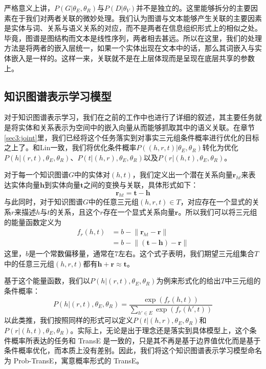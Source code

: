 严格意义上讲，$P(G|{\theta_E,\theta_R})$与$P(D|{\theta_V})$并不是独立的。这里能够拆分的主要因素在于我们对两者关联的微妙处理。我们认为图谱与文本能够产生关联的主要因素是实体与词、关系与语义关系的对应，而不是两者在信息组织形式上的相似之处。毕竟，图谱是图结构而文本是线性序列，两者相去甚远。所以在这里，我们的处理方法是将两者的嵌入层统一，如果一个实体出现在文本中的话，那么其词嵌入与实体嵌入是一样的。这样一来，关联就不是在上层体现而是呈现在底层共享的参数上。

\subsection{知识图谱表示学习模型}
\label{sec3:kg}

对于知识图谱表示学习，我们在之前的工作中也进行了详细的叙述，其主要任务就是将实体和关系表示为空间中的嵌入向量从而能够抓取其中的语义关联。在章节\ref{sec3:joint}里，我们已经将这个任务落实到对事实三元组条件概率进行优化的目标之上了。和Lin\cite{Lin2016Knowledge}一致，我们将优化条件概率$P((h, r, t)|{\theta_E, \theta_R})$转化为优化$P(h|(r, t),{\theta_E, \theta_R})$、$P(t|(h, r),{\theta_E, \theta_R})$以及$P(r|(h, t),{\theta_E, \theta_R})$。

对于每一个知识图谱$G$中的实体对$(h, t)$，我们定义出一个潜在关系向量$\mathbf{r}_{ht}$来表达实体向量$\mathbf{h}$到实体向量$\mathbf{t}$之间的变换与关联，具体形式如下：
\begin{equation}
\textbf{r}_{ht} = \textbf{t} - \textbf{h}
\end{equation}
与此同时，对于知识图谱$G$中的任意三元组$(h, r, t) \in T$，对应存在一个显式的关系$r$来描述$h$与$t$的关系，且这个$r$存在一个显式关系向量$\textbf{r}$。所以我们可以将三元组的能量函数定义为
\begin{align}
\label{eq3:kg_distance}
f_r(h, t) & = b - \lVert \textbf{r}_{ht} - \textbf{r} \rVert  
\\\nonumber
		& = b - \lVert (\textbf{t} - \textbf{h}) - \textbf{r}  \rVert
\end{align}
这里，$b$是一个常数偏移量，通常在$7$左右。这个式子表明，我们期望三元组集合$T$中的任意三元组$(h, r, t)$都有$\textbf{h} + \textbf{r} \approx \textbf{t}$。

基于这个能量函数，我们以$P(h|(r, t),{\theta_E, \theta_R})$为例来形式化的给出$T$中三元组的条件概率：
\begin{equation}
P(h|(r, t),{\theta_E, \theta_R}) = \frac{\exp(f_r(h, t))}{\sum_{h' \in E} \exp(f_r(h', t))}
\end{equation}
以此类推，我们按照同样的形式可以定义$P(t|(h, r), {\theta_E, \theta_R})$和$P(r|(h, t),{\theta_E, \theta_R})$。实际上，无论是出于理念还是落实到具体模型上，这个条件概率所表达的任务和 TransE 是一致的，只是其不再是基于边界值优化而是基于条件概率优化，而本质上没有差别。因此，我们将这个知识图谱表示学习模型命名为 Prob-TransE，寓意概率形式的 TransE。

